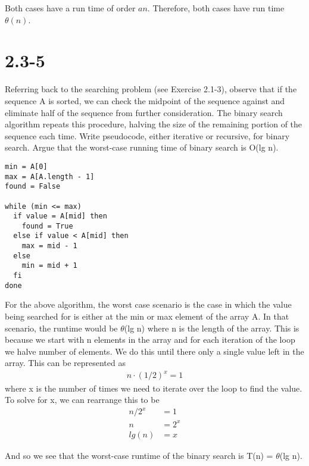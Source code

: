 \documentclass{article}
\begin{document}
{\noindent
Both cases have a run time of order $an$. Therefore, both cases have run time
$\theta(n)$.

\section{2.3-5}
Referring back to the searching problem (see Exercise 2.1-3), observe
that if the sequence A is sorted, we can check the midpoint of the
sequence against and eliminate half of the sequence from further
consideration. The binary search algorithm repeats this procedure,
halving the size of the remaining portion of the sequence each time.
Write pseudocode, either iterative or recursive, for binary search. Argue
that the worst-case running time of binary search is O(lg n).

\begin{verbatim}
min = A[0]
max = A[A.length - 1]
found = False

while (min <= max)
  if value = A[mid] then
    found = True
  else if value < A[mid] then
    max = mid - 1
  else
    min = mid + 1
  fi
done
\end{verbatim}

\noindent
For the above algorithm, the worst case scenario is the case in which the value
being searched for is either at the min or max element of the array A. In
that scenario, the runtime would be $\theta$(lg n) where n is the length of the
array. This is because we start with n elements in the array and for each
iteration of the loop we halve number of elements. We do this until there
only a single value left in the array. This can be represented as
\begin{align*}
  n \cdot (1/2)^x = 1
\end{align*}
where x is the number of times we need to iterate over the loop to find
the value. To solve for x, we can rearrange this to be
\begin{align*}
  n/2^x &= 1 \\
  n &= 2^x \\
  lg(n) &= x
\end{align*}

And so we see that the worst-case runtime of the binary search is
T(n) = $\theta$(lg n).
}
\end{document}
